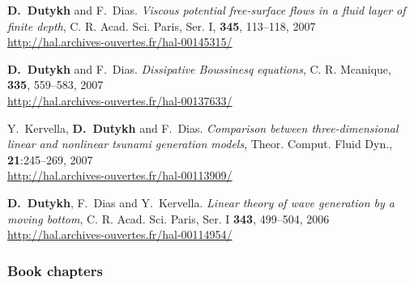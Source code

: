 \begin{etaremune}
  

  
  
  \item \textbf{D.~Dutykh} and F.~Dias. \textit{Viscous potential free-surface flows in a fluid layer of finite depth}, C. R. Acad. Sci. Paris, Ser. I, \textbf{345}, 113--118, 2007 \\ %
  \url{http://hal.archives-ouvertes.fr/hal-00145315/}
  
  \item \textbf{D.~Dutykh} and F.~Dias. \textit{Dissipative Boussinesq equations}, C. R. Mcanique, \textbf{335}, 559--583, 2007 \\ %
  \url{http://hal.archives-ouvertes.fr/hal-00137633/}
  
  \item  Y.~Kervella, \textbf{D.~Dutykh} and F.~Dias. \textit{Comparison between three-dimensional linear and nonlinear tsunami generation models}, Theor. Comput. Fluid Dyn., \textbf{21}:245--269, 2007 \\ %
  \url{http://hal.archives-ouvertes.fr/hal-00113909/}
  
  
  
  \item \textbf{D.~Dutykh}, F.~Dias and Y.~Kervella. \textit{Linear theory of wave generation by a moving bottom}, C. R. Acad. Sci. Paris, Ser. I \textbf{343}, 499--504, 2006 \\ %
  \url{http://hal.archives-ouvertes.fr/hal-00114954/}
 
\end{etaremune}

\separator
\subsubsection{Book chapters}


